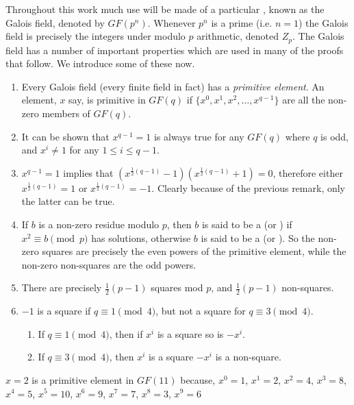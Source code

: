 Throughout this work much use will be made of a particular , known as the Galois field, denoted by $GF(p^n)$.
Whenever $p^n$ is a prime (i.e. $n = 1$) the Galois field is precisely the integers under modulo $p$ arithmetic, denoted $Z_p$.
The Galois field has a number of important properties which are used in many of the proofs that follow.
We introduce some of these now.

\begin{enumerate}

\item{Every Galois field (every finite field in fact) has a \emph{primitive element}.
An element, $x$ say, is primitive in $GF(q)$ if
$\{x^0, x^1, x^2, \ldots, x^{q - 1}\}$
are all the non-zero members of $GF(q)$.}

\item{It can be shown
\cite{boseResolvableSeriesBalanced1947}
that $x^{q - 1} = 1$ is always true for any $GF(q)$ where $q$ is odd, and $x^i \neq 1$ for any $1 \leq i \leq q - 1$.}

\item{$x^{q - 1} = 1$ implies that $(x^{\frac{1}{2}(q - 1)} - 1)(x^{\frac{1}{2}(q - 1)} + 1) = 0$, therefore either $x^{\frac{1}{2}(q - 1)} = 1$ or $x^{\frac{1}{2}(q - 1)} = -1$.
Clearly because of the previous remark, only the latter can be true.}

\item{If $b$ is a non-zero residue modulo $p$, then $b$ is said to be a  (or ) if $x^2 \equiv b \pmod p$ has solutions, otherwise $b$ is said to be a  (or ).
So the non-zero squares are precisely the even powers of the primitive element, while the non-zero non-squares are the odd powers.}

\item{There are precisely $\frac{1}{2}(p - 1)$ squares mod $p$, and $\frac{1}{2}(p - 1)$ non-squares.}

\item{$-1$ is a square if $q \equiv 1 \pmod 4$, but not a square for $q \equiv 3 \pmod 4$.
\begin{enumerate}
  \item{If $q \equiv 1 \pmod 4$, then if $x^i$ is a square so is $-x^i$.}
  \item{If $q \equiv 3 \pmod 4$, then $x^i$ is a square $-x^i$ is a non-square.}
\end{enumerate}}

\end{enumerate}

\begin{example}
$x = 2$ is a primitive element in $GF(11)$ because, $x^0 = 1$, $x^1 = 2$, $x^2 = 4$, $x^3 = 8$, $x^4 = 5$, $x^5 = 10$, $x^6 = 9$, $x^7 = 7$, $x^8 = 3$, $x^9 = 6$
\label{eg:primitive}
\end{example}

